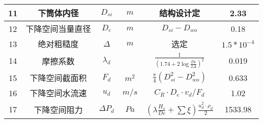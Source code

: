 \begin{table}[H]
{\begin{tabular}{|c|c|c|c|c|c|}
            11   & 下筒体内径       & $ D_{si} $     & $ m $      & 结构设计定                                                            & 2.33             \\ \hline
            12   & 下降空间当量直径 & $ D_{e} $      & $ m $      & $ D_{si} - D_{wo} $                                                   & 0.18             \\ \hline
            13   & 绝对粗糙度       & $ \Delta $     & $ m $      & 选定                                                                  & $ 1.5*10^{-4} $  \\ \hline
            14   & 摩擦系数         & $ \lambda_d $  &            & $ \frac{1}{(1.74+2 \log \frac{De}{2 \Delta})^2} $                     & 0.019            \\ \hline
            15   & 下降空间截面积   & $ F_d $        & $ m^2 $    & $ \frac{\pi}{4}(D_{si}^{2}-D_{wo}^{2}) $                              & 0.633            \\ \hline
            16   & 下降空间水流速   & $ u_d $        & $ m/s $    & $ C_R \cdot D_e \cdot v_d / F_d $                                     & 1.02             \\ \hline
            17   & 下降空间阻力     & $ \Delta P_d $ & $ Pa $     & $ (\lambda \frac{H_o}{De}+\sum \xi)\frac{u_{d}^{2} \cdot \rho_d}{2} $ & 1533.98          \\ \hline
        \end{tabular}
    }
\end{table}

\newpage
